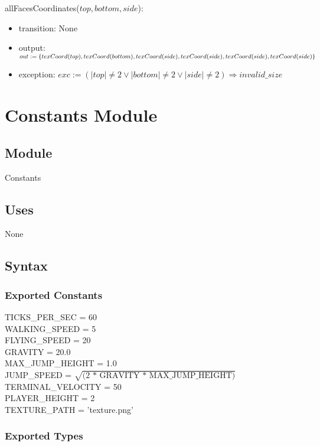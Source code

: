 \documentclass[12pt]{article}
\begin{document}
\noindent allFacesCoordinates($top, bottom, side$):
\begin{itemize}
\item transition: None
\item output: $out := \{ texCoord(top), texCoord(bottom), texCoord(side), texCoord(side),\\
texCoord(side), texCoord(side) \}$
\item exception: $ exc := (|top| \neq 2 \lor |bottom| \neq 2 \lor |side| \neq 2) \Rightarrow invalid\_size $\\
\end{itemize}

\newpage

\section* {Constants Module}

\subsection*{Module}

Constants

\subsection* {Uses}

None

\subsection* {Syntax}

\subsubsection* {Exported Constants}

TICKS\_PER\_SEC = 60\\
WALKING\_SPEED = 5\\
FLYING\_SPEED = 20\\
GRAVITY = 20.0\\
MAX\_JUMP\_HEIGHT = 1.0\\
JUMP\_SPEED = $\sqrt{\mbox{(2 * GRAVITY * MAX\_JUMP\_HEIGHT)}}$\\
TERMINAL\_VELOCITY = 50\\
PLAYER\_HEIGHT = 2\\
TEXTURE\_PATH = 'texture.png'

\subsubsection* {Exported Types}
\end{document}
